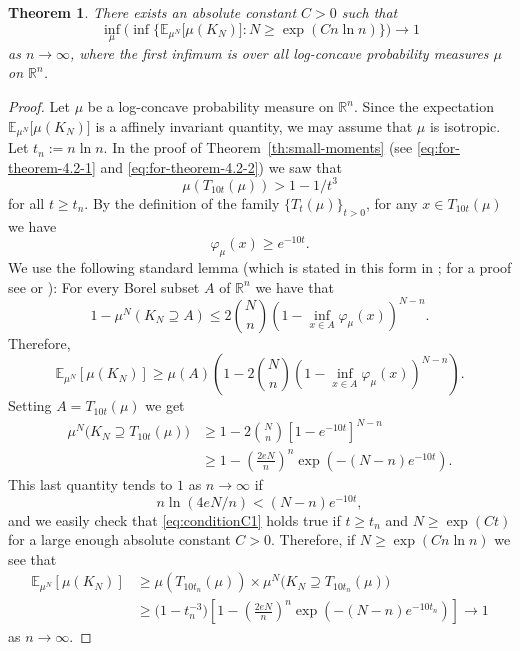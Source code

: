 \documentclass[11pt,leqno]{article}
\newtheorem{theorem}{Theorem}[section]
\theoremstyle{definition}
\theoremstyle{remark}
\numberwithin{equation}{section}
\newcommand{\ls}{\leqslant}
\newcommand{\gr}{\geqslant}
\newcommand{\1}{\textbf{1}}
\begin{document}
\begin{theorem}\label{th:non-sharp}There exists an absolute constant $C>0$ such that
$$\inf_{\mu }\Big(\inf\Big\{ {\mathbb E}_{\mu^N}\big[\mu (K_N)\big]: N\gr \exp (Cn\ln n)\Big\}\Big)\longrightarrow 1$$
as $n\to\infty $, where the first infimum is over all log-concave probability measures $\mu $ on ${\mathbb R}^n$.
\end{theorem}


\begin{proof}Let $\mu$ be a log-concave probability measure on $\mathbb{R}^n$. Since the expectation
${\mathbb E}_{\mu^N}\big[\mu (K_N)\big]$ is a affinely invariant quantity, we may assume that $\mu$ is isotropic.
Let $t_n:=n\ln n$. In the proof of Theorem~\ref{th:small-moments} (see \eqref{eq:for-theorem-4.2-1} and \eqref{eq:for-theorem-4.2-2}) we saw that
$$\mu(T_{10t}(\mu))>1-1/t^3$$
for all $t\gr t_n$. By the definition of the family $\{T_t(\mu)\}_{t>0}$, for any $x\in T_{10t}(\mu)$ we have
\begin{equation*}\varphi_{\mu }(x)\gr e^{-10t}.\end{equation*}
We use the following standard lemma (which is stated in this form in \cite[Lemma~3]{Chakraborti-Tkocz-Vritsiou-2021};
for a proof see \cite{DFM} or \cite[Lemma~4.1]{Gatzouras-Giannopoulos-2009}): For every Borel subset $A$ of ${\mathbb R}^n$ we have that
$$1-\mu^N(K_N\supseteq A)\ls 2\binom{N}{n}\left (1-\inf_{x\in A}\varphi_{\mu }(x)\right)^{N-n}.$$
Therefore,
$${\mathbb E}_{\mu^N}[\mu (K_N)]\gr \mu (A)\left (1-2\binom{N}{n}\left (1-\inf_{x\in A}\varphi_{\mu }(x)\right)^{N-n}\right).$$
Setting $A=T_{10t}(\mu)$ we get
\begin{align*}\mu^N\Big(K_N\supseteq T_{10t}(\mu)\Big)
&\gr 1-2\binom{N}{n}\left [1-e^{-10t}\right]^{N-n}\\
&\gr 1-\left(\frac{2eN}{n}\right)^n\exp \left(-(N-n)e^{-10t}\right).
\end{align*}
This last quantity tends to $1$ as $n\to\infty $ if
\begin{equation}\label{eq:conditionC1}n\ln (4eN/n)<(N-n)e^{-10t},\end{equation}
and we easily check that \eqref{eq:conditionC1} holds true if $t\gr t_n$ and $N\gr \exp (Ct)$ for a large enough absolute constant $C>0$. 
Therefore, if $N\gr \exp (Cn\ln n)$ we see that
\begin{align*}{\mathbb E}_{\mu^N}\left[\mu (K_N)\right]
&\gr \mu (T_{10t_n}(\mu))\times \mu^N\Big(K_N\supseteq T_{10t_n}(\mu)\Big)\\
&\gr \big(1-t_n^{-3}\big)\left[1-\left(\frac{2eN}{n}\right)^n\exp \left(-(N-n)e^{-10t_n}\right)\right]\longrightarrow 1
\end{align*}
as $n\to\infty $.
\end{proof}
\end{document}
